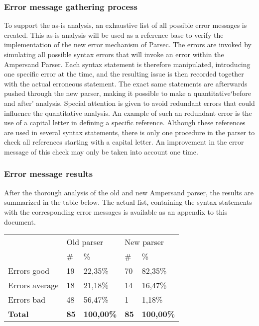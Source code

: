 \subsubsection{Error message gathering process}

To support the as-is analysis, an exhaustive list of all possible error messages is created.
This as-is analysis will be used as a reference base to verify the implementation of the new error mechanism of Parsec.
The errors are invoked by simulating all possible syntax errors that will invoke an error within the Ampersand Parser.
Each syntax statement is therefore manipulated, introducing one specific error at the time, and the resulting issue is then recorded together with the actual erroneous statement.
The exact same statements are afterwards pushed through the new parser, making it possible to make a quantitative`before and after' analysis.
Special attention is given to avoid redundant errors that could influence the quantitative analysis. 
An example of such an redundant error is the use of a capital letter in defining a specific reference. 
Although these references are used in several syntax statements, there is only one procedure in the parser to check all references starting with a capital letter.
An improvement in the error message of this check may only be taken into account one time.

\subsubsection{Error message results}
After the thorough analysis of the old and new Ampersand parser, the results are summarized in the table below.
The actual list, containing the syntax statements with the corresponding error messages is available as an appendix to this document.

\begin{table}[h]
	\begin{tabular}{lllll}
               & \multicolumn{2}{l}{Old parser} & \multicolumn{2}{l}{New parser} \\
               & \#          & \%               & \#          & \%               \\
		Errors good    & 19          & 22,35\%          & 70          & 82,35\%          \\
		Errors average & 18          & 21,18\%          & 14          & 16,47\%          \\
		Errors bad     & 48          & 56,47\%          & 1           & 1,18\%           \\
		\rowcolor[HTML]{9B9B9B} 
		{\bf Total}    & {\bf 85}    & {\bf 100,00\%}   & {\bf 85}    & {\bf 100,00\%}  
	\end{tabular}
\end{table}

